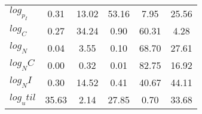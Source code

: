 \begin{center}
\begin{longtable}{lccccc}
$log_p_I   $	 & 	        0.31	 & 	       13.02	 & 	       53.16	 & 	        7.95	 & 	       25.56 \\ 
$log_C     $	 & 	        0.27	 & 	       34.24	 & 	        0.90	 & 	       60.31	 & 	        4.28 \\ 
$log_N     $	 & 	        0.04	 & 	        3.55	 & 	        0.10	 & 	       68.70	 & 	       27.61 \\ 
$log_NC    $	 & 	        0.00	 & 	        0.32	 & 	        0.01	 & 	       82.75	 & 	       16.92 \\ 
$log_NI    $	 & 	        0.30	 & 	       14.52	 & 	        0.41	 & 	       40.67	 & 	       44.11 \\ 
$log_util  $	 & 	       35.63	 & 	        2.14	 & 	       27.85	 & 	        0.70	 & 	       33.68 \\ 
\end{longtable}
 \end{center}
